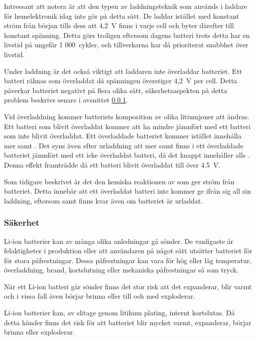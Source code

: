 \documentclass[a4paper,12pt]{article}
\begin{document}
Intressant att notera är att den typen av laddningsteknik som används i laddare för hemelektronik idag inte gör på detta sätt.\cite{apple} De laddar istället med konstant ström från början tills dess att 4,2~V finns i varje cell och byter därefter till konstant spänning. Detta görs troligen eftersom dagens batteri trots detta har en livstid på ungefär 1 000~cykler, och tillverkarna har då prioriterat snabbhet över livstid.

Under laddning är det också viktigt att laddaren inte överladdar batteriet. Ett batteri räknas som överladdat då spänningen överstiger 4,2~V per cell. Detta påverkar batteriet negativt på flera olika sätt, säkerhetsaspekten på detta problem beskrivs senare i avsnittet \ref{säkerhet}.

Vid överladdning kommer batteriets komposition av olika litiumjoner att ändras. Ett batteri som blivit överladdat kommer att ha mindre  jämnfört med ett batteri som inte blivit överladdat. Ett överladdade batteriet kommer istället innehålla mer  samt  \cite{overcharging-type}. Det syns även efter urladdning att mer  samt  finns i ett överladdade batteriet jämnfört med ett icke överladdat batteri, då det knappt innehåller  alls \cite{overcharging-type}. Denna effekt framträdde då ett batteri blivit överladdat till över 4.5~V.

Som tidigare beskrivet är det den kemiska reaktionen av  som ger ström från batteriet. Detta innebär att ett överladdat batteri inte kommer ge ifrån sig all sin laddning, eftersom  samt  finns kvar även om batteriet är urladdat. 

\subsubsection{Säkerhet}
\label{säkerhet}
Li-ion batterier kan av många olika anledningar gå sönder. De vanligaste är felaktigheter i produktion eller att användaren på något sätt utsätter batteriet för för stora påfrestningar. Dessa påfrestningar kan vara för hög eller låg temperatur, överladdning, brand, kortslutning eller mekaniska påfrestningar så som tryck. \cite{lihazard}

När ett Li-ion batteri går sönder finns det stor risk att det expanderar, blir varmt och i vissa fall även börjar brinna eller till och med exploderar.

Li-ion batterier kan, av slitage genom litihum plating, internt kortslutas.\cite{nasa} Då detta händer finns det risk för att batteriet blir mycket varmt, expanderar, börjar brinna eller exploderar.
\end{document}
